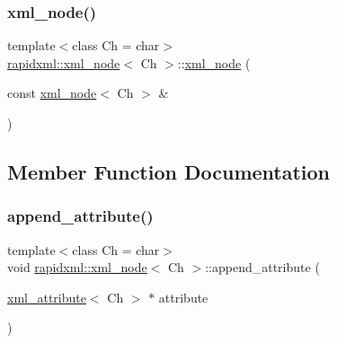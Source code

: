 \subsubsection{\texorpdfstring{xml\_node()}{xml\_node()}\hspace{0.1cm}{\footnotesize\ttfamily [2/2]}}
{\footnotesize\ttfamily template$<$class Ch = char$>$ \\
\mbox{\hyperlink{classrapidxml_1_1xml__node}{rapidxml\+::xml\+\_\+node}}$<$ Ch $>$\+::\mbox{\hyperlink{classrapidxml_1_1xml__node}{xml\+\_\+node}} (\begin{DoxyParamCaption}\item[{const \mbox{\hyperlink{classrapidxml_1_1xml__node}{xml\+\_\+node}}$<$ Ch $>$ \&}]{ }\end{DoxyParamCaption})\hspace{0.3cm}{\ttfamily [private]}}



\subsection{Member Function Documentation}
\mbox{\label{classrapidxml_1_1xml__node_a33ce3386f8c42dd4db658b75cbb6e6c4}} 
\subsubsection{\texorpdfstring{append\_attribute()}{append\_attribute()}}
{\footnotesize\ttfamily template$<$class Ch = char$>$ \\
void \mbox{\hyperlink{classrapidxml_1_1xml__node}{rapidxml\+::xml\+\_\+node}}$<$ Ch $>$\+::append\+\_\+attribute (\begin{DoxyParamCaption}\item[{\mbox{\hyperlink{classrapidxml_1_1xml__attribute}{xml\+\_\+attribute}}$<$ Ch $>$ $\ast$}]{attribute }\end{DoxyParamCaption})\hspace{0.3cm}{\ttfamily [inline]}}

